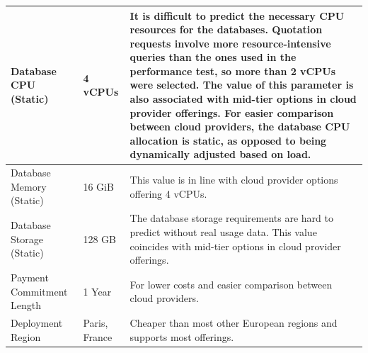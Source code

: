 \documentclass[12pt, reqno, oneside]{amsbook}
\theoremstyle{definition}
\theoremstyle{definition}
\numberwithin{section}{chapter}
\numberwithin{table}{chapter}
\numberwithin{figure}{chapter}
\begin{document}
\begin{longtable}{|M{70pt}|M{55pt}|m{300pt}|}
  \hline
  Database CPU (Static)
   & 4 vCPUs
   & It is difficult to predict the necessary \ac{CPU} resources for the databases. Quotation requests involve more resource-intensive queries than the ones used in the performance test, so more than 2 \acp{vCPU} were selected. The value of this parameter is also associated with mid-tier options in cloud provider offerings. For easier comparison between cloud providers, the database \ac{CPU} allocation is static, as opposed to being dynamically adjusted based on load. \\
  \hline
  Database Memory (Static)
   & 16 GiB
   & This value is in line with cloud provider options offering 4 \acp{vCPU}.                                                                                                                                                                                                                                                                                                                                                                                                            \\
  \hline
  Database Storage (Static)
   & 128 GB
   & The database storage requirements are hard to predict without real usage data. This value coincides with mid-tier options in cloud provider offerings.                                                                                                                                                                                                                                                                                                                              \\
  \hline
  Payment Commitment Length
   & 1 Year
   & For lower costs and easier comparison between cloud providers.                                                                                                                                                                                                                                                                                                                                                                                                                      \\
  \hline
  Deployment Region
   & Paris, France
   & Cheaper than most other European regions and supports most offerings.                                                                                                                                                                                                                                                                                                                                                                                                               \\

\end{longtable}
\end{document}
